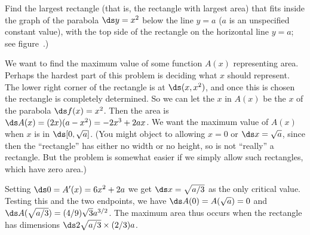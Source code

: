 \begin{example} Find the largest rectangle (that is, the rectangle with largest
area) that fits inside the graph of the parabola $\ds y=x^2$ below the
line $y=a$ ($a$ is an unspecified constant value), with the top side of
the rectangle on the horizontal line $y=a$; see
figure~.)

We want to find the maximum value of some function $A(x)$ representing
area.  Perhaps the hardest part of this problem is deciding what $x$
should represent. The lower right corner of the rectangle is at
$\ds (x,x^2)$, and once this is chosen the rectangle is completely
determined. So we can let the $x$ in $A(x)$ be the $x$ of the parabola
$\ds f(x)=x^2$.  Then the area is $\ds A(x)=(2x)(a-x^2)=-2x^3+2ax$. We want
the maximum value of $A(x)$ when $x$ is in $\ds [0,\sqrt{a}]$. (You might
object to allowing $x=0$ or $\ds x=\sqrt{a}$, since then the ``rectangle''
has either no width or no height, so is not ``really'' a
rectangle. But the problem is somewhat easier if we simply allow such
rectangles, which have zero area.) 

Setting $\ds 0=A'(x)=6x^2+2a$ we get $\ds x=\sqrt{a/3}$ as the only critical
value. Testing this and the two endpoints, we have
$\ds A(0)=A(\sqrt{a})=0$ and $\ds A(\sqrt{a/3})=(4/9)\sqrt{3}a^{3/2}$. The
maximum area thus occurs when the rectangle has dimensions
$\ds 2\sqrt{a/3}\times (2/3)a$.
\end{example}


